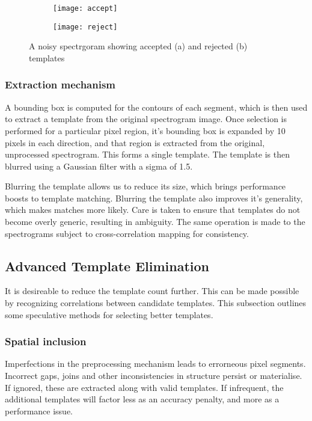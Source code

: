 \begin{figure}[!htb]
  \centering
  \begin{subfigure}[b]{1.0\textwidth}
    \centering
    \texttt{[image: accept]}
    \caption{}
  \end{subfigure}
  \begin{subfigure}[b]{1.0\textwidth}
    \centering
    \texttt{[image: reject]}
    \caption{}
  \end{subfigure}
  \caption{A noisy spectrgoram showing accepted (a) and rejected (b) templates}
  \label{fig:template_select_effects}
\end{figure}

\subsubsection{Extraction mechanism}\label{sec:extract}

A bounding box is computed for the contours of each segment, which is then used
to extract a template from the original spectrogram image.
Once selection is performed for a particular pixel region, it's bounding box is
expanded by 10 pixels in each direction, and that region is extracted from the
original, unprocessed spectrogram.
This forms a single template.
The template is then blurred using a Gaussian filter with a sigma of 1.5.

Blurring the template allows us to reduce its size, which brings performance
boosts to template matching.
Blurring the template also improves it's generality, which makes matches more
likely.
Care is taken to ensure that templates do not become overly generic, resulting
in ambiguity.
The same operation is made to the spectrograms subject to cross-correlation
mapping for consistency.

\subsection{Advanced Template Elimination}\label{sec:advrem}
It is desireable to reduce the template count further.
This can be made possible by recognizing correlations between candidate templates.
This subsection outlines some speculative methods for
selecting better templates.

\subsubsection{Spatial inclusion}
Imperfections in the preprocessing mechanism leads to errorneous pixel segments.
Incorrect gaps, joins and other inconsistencies in structure persist or
materialise.
If ignored, these are extracted along with valid templates.
If infrequent, the additional templates will factor less as an accuracy penalty,
and more as a performance issue.

